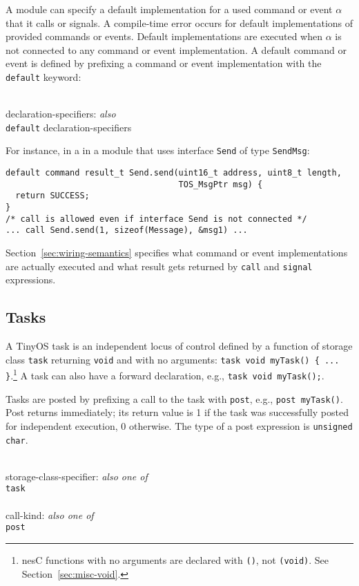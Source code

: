 \documentclass[11pt]{article}
\newcommand{\kw}[1]{{\tt #1}}
\newcommand{\code}[1]{{\tt #1}}
\newcommand{\nesc}{nesC\xspace}
\begin{document}
A module can specify a default implementation for a used command or event
$\alpha$ that it calls or signals. A compile-time error occurs for default
implementations of provided commands or events. Default implementations are
executed when $\alpha$ is not connected to any command or event
implementation. A default command or event is defined by prefixing a
command or event implementation with the \kw{default} keyword:
\em \begin{tabbing}
\hspace*{2cm}\= \\ \kill
declaration-specifiers: \emph{also}\\
\>	\kw{default} declaration-specifiers\\
\end{tabbing} \rm
For instance, in a in a module that uses interface \code{Send} of type
\kw{SendMsg}:
\begin{verbatim}
default command result_t Send.send(uint16_t address, uint8_t length, 
                                   TOS_MsgPtr msg) {
  return SUCCESS;
}
/* call is allowed even if interface Send is not connected */
... call Send.send(1, sizeof(Message), &msg1) ...
\end{verbatim}

Section~\ref{sec:wiring-semantics} specifies what command or event
implementations are actually executed and what result gets returned by
\code{call} and \code{signal} expressions.

\subsection{Tasks}

A TinyOS task is an independent locus of control defined by a function of
storage class \kw{task} returning \kw{void} and with no arguments:
\code{task void myTask() \{ ... \}}.\footnote{\nesc functions with no
arguments are declared with \code{()}, not \code{(void)}. See
Section~\ref{sec:misc-void}.} A task can also have a forward declaration, e.g.,
\code{task void myTask();}.

Tasks are posted by prefixing a call to the task with \kw{post}, e.g.,
\code{post myTask()}. Post returns immediately; its return value is 1 if
the task was successfully posted for independent execution, 0
otherwise. The type of a post expression is \code{unsigned char}.
\em \begin{tabbing}
\hspace*{2cm}\= \\ \kill
storage-class-specifier: \emph{also one of}\\
\>	\kw{task}\\
\\
call-kind: \emph{also one of}\\
\>	\kw{post}
\end{tabbing} \rm
\end{document}
